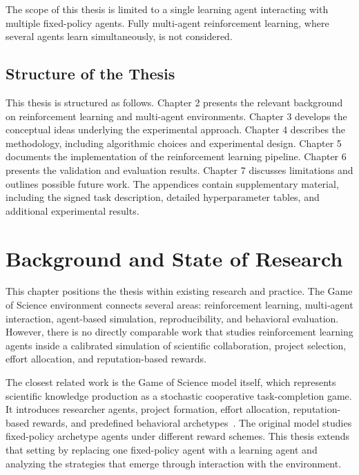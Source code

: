 \documentclass[english,bachelor]{hsluthesis}
\begin{document}
The scope of this thesis is limited to a single learning agent interacting with multiple fixed-policy agents. Fully multi-agent reinforcement learning, where several agents learn simultaneously, is not considered.

\section{Structure of the Thesis}

This thesis is structured as follows. Chapter 2 presents the relevant background on reinforcement learning and multi-agent environments. Chapter 3 develops the conceptual ideas underlying the experimental approach. Chapter 4 describes the methodology, including algorithmic choices and experimental design. Chapter 5 documents the implementation of the reinforcement learning pipeline. Chapter 6 presents the validation and evaluation results. Chapter 7 discusses limitations and outlines possible future work. The appendices contain supplementary material, including the signed task description, detailed hyperparameter tables, and additional experimental results.

\chapter{Background and State of Research}

This chapter positions the thesis within existing research and practice. The Game of Science environment connects several areas: reinforcement learning, multi-agent interaction, agent-based simulation, reproducibility, and behavioral evaluation. However, there is no directly comparable work that studies reinforcement learning agents inside a calibrated simulation of scientific collaboration, project selection, effort allocation, and reputation-based rewards.

The closest related work is the Game of Science model itself, which represents scientific knowledge production as a stochastic cooperative task-completion game. It introduces researcher agents, project formation, effort allocation, reputation-based rewards, and predefined behavioral archetypes~\cite{bless_game_of_science_2026}. The original model studies fixed-policy archetype agents under different reward schemes. This thesis extends that setting by replacing one fixed-policy agent with a learning agent and analyzing the strategies that emerge through interaction with the environment.
\end{document}
